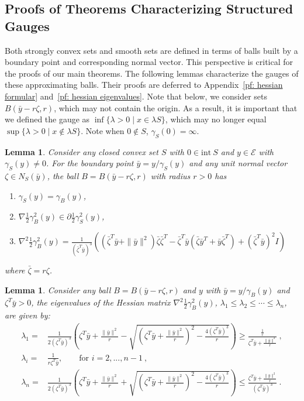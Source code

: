 \documentclass[sn-mathphys,Numbered]{sn-jnl}%
\newtheorem{lemma}[theorem]{Lemma}%
\begin{document}
\subsection{Proofs of Theorems Characterizing Structured Gauges} \label{subsec:proofs}
Both strongly convex sets and smooth sets are defined in terms of balls built by a boundary point and corresponding normal vector. This perspective is critical for the proofs of our main theorems. The following lemmas characterize the gauges of these approximating balls. Their proofs are deferred to Appendix~\ref{pf: hessian formular} and~\ref{pf: hessian eigenvalues}. Note that below, we consider sets $B(\bar y-r\zeta, r)$, which may not contain the origin. As a result, it is important that we defined the gauge as $\inf\{\lambda>0 \mid x \in \lambda S\}$, which may no longer equal $\sup\{\lambda>0 \mid x \not\in \lambda S\}$. Note when $0 \notin S$, $\gamma_S(0)=\infty$.


\begin{lemma}\label{lemma: hessian formular}
    Consider any closed convex set $S$ with $0\in \mathrm{int\ } S$ and $y\in \mathcal{E}$ with $\gamma_S(y)\neq 0$. For the boundary point $\bar y=y/\gamma_S(y)$ and any unit normal vector $\zeta \in N_S(\bar y)$, the ball $B=B(\bar y-r\zeta, r)$ with radius $r>0$ has
    \begin{enumerate}[label=(\alph*)]
        \item $\gamma_S(y)=\gamma_B(y)$,
        \item $\nabla \frac{1}{2}\gamma_B^2(y) \in \partial \frac{1}{2}\gamma_S^2(y)$,
        \item $\nabla^2 \frac{1}{2}\gamma_B^2(y) = \frac{1}{\left(\bar \zeta^T \bar{y}\right)^3}\left(\left(\bar \zeta^T \bar{y}+\|\bar{y}\|^2\right)\bar\zeta\bar\zeta^T-\bar \zeta^T \bar{y}(\bar\zeta\bar{y}^T+\bar{y}\bar\zeta^T)+\left(\bar \zeta^T \bar{y}\right)^2I \right)$
    \end{enumerate}
    where $\bar \zeta =r\zeta$.
\end{lemma}


\begin{lemma}\label{lemma: hessian eigenvalues}
    Consider any ball $B=B(\bar y-r\zeta, r)$ and $y$ with $\bar y = y/\gamma_B(y)$ and $\zeta^T\bar y > 0$, the eigenvalues of the Hessian matrix $\nabla ^2 \frac{1}{2}\gamma_B^2(y)$, $\lambda_1 \leq \lambda_2 \leq \cdots \leq \lambda_n$, are given by:
    \begin{align*}
    \lambda_1 =& \frac{1}{2( \zeta^T \bar y)^3}\left( \zeta^T \bar y+\frac{\|\bar y\|^2}{r}-\sqrt{\left( \zeta ^T\bar y+\frac{\|\bar y\|^2}{r}\right)^2-\frac{4( \zeta^T \bar y)^3}{r}}\right) \geq \frac{\frac{1}{r}}{\zeta^T \bar y + \frac{\|\bar y\|^2}{r}} \ ,  \\
    \lambda_i =& \frac{1}{r\zeta^T \bar y}, \qquad \text{for } i=2,...,n-1 \ , \\
    \lambda_n =& \frac{1}{2( \zeta^T \bar y)^3}\left( \zeta^T \bar y+\frac{\|\bar y\|^2}{r}+\sqrt{\left( \zeta ^T\bar y+\frac{\|\bar y\|^2}{r}\right)^2-\frac{4( \zeta^T \bar y)^3}{r}}\right) \leq \frac{\zeta ^T\bar y+\frac{\|\bar y\|^2}{r}}{(\zeta^T \bar y)^3}\ .
    \end{align*}
\end{lemma}
\end{document}
